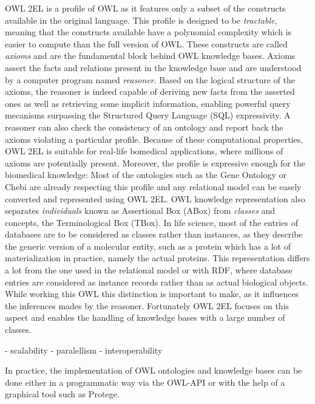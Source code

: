 \documentclass{bioinfo}
\begin{document}
OWL 2EL is a profile of OWL as it features only a subset of the constructs available in the original language. This profile is
designed to be \emph{tractable}, meaning that the constructs available have a polynomial complexity which is easier to compute than the full 
version of OWL. These constructs are called \emph{axioms} and are the fundamental block behind OWL knowledge bases. 
Axioms assert the facts and relations present in the knowledge base and are understood by a computer program named \emph{reasoner}. 
Based on the logical structure of the axioms, the reasoner is indeed capable of deriving new facts from the asserted ones as well as retrieving
some implicit information, enabling powerful query mecanisms surpassing the Structured Query Language (SQL) expressivity. 
A reasoner can also check the consistency of an ontology and report back the axioms violating a particular profile. Because of 
these computational properties, OWL 2EL is suitable for real-life bomedical applications, where millions of axioms are potentially present.
Moreover, the profile is expressive enough for the biomedical knowledge: Most of the ontologies such as the Gene Ontology or Chebi
are already respecting this profile and any relational model can be easely converted and represented using OWL 2EL. OWL knowledge representation
also separates \emph{individuals} known as Assertional Box (ABox) from \emph{classes} and concepts, the Terminological Box (TBox). In life
science, most of the entries of databases are to be considered as classes rather than instances, as they describe the generic version of
a molecular entity, such as a protein which has a lot of materialization in practice, namely the actual proteins. 
This representation differs a lot from the one used in the relational model or with RDF, where database entries are considered as instance 
records rather than as actual biological objects.
While working this OWL this distinction is important to make, as it influences the inferences mades by the reasoner. Fortunately OWL 2EL focuses
on this aspect and enables the handling of knowledge bases with a large number of classes.

- scalability - paralellism
- interoperability

In practice, the implementation of OWL ontologies and knowledge bases can be done either in a programmatic way via the OWL-API or with the
help of a graphical tool such as Protege.
\end{document}
